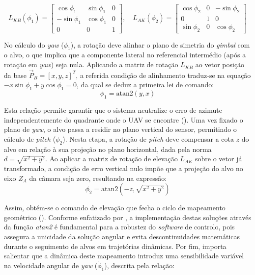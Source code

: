 \begin{equation}
    L_{KB}(\phi_1) = \begin{bmatrix} \cos\phi_1 & \sin\phi_1 & 0 \\ -\sin\phi_1 & \cos\phi_1 & 0 \\ 0 & 0 & 1 \end{bmatrix}, \quad 
    L_{AK}(\phi_2) = \begin{bmatrix} \cos\phi_2 & 0 & -\sin\phi_2 \\ 0 & 1 & 0 \\ \sin\phi_2 & 0 & \cos\phi_2 \end{bmatrix}
\end{equation}


No cálculo do \emph{yaw} ($\phi_1$), a rotação deve alinhar o plano de simetria do \emph{gimbal} com o alvo, o que implica que a componente lateral no referencial intermédio (após a rotação em \emph{yaw}) seja nula. Aplicando a matriz de rotação $L_{KB}$ ao vetor posição da base $\vec{P}_B = [x, y, z]^T$, a referida condição de alinhamento traduz-se na equação $-x\sin\phi_1 + y\cos\phi_1 = 0$, da qual se deduz a primeira lei de comando:
\begin{equation}\phi_{1} = \text{atan2}(y, x)\end{equation}

Esta relação permite garantir que o sistema neutralize o erro de azimute independentemente do quadrante onde o UAV se encontre (\cite{equations2001}). Uma vez fixado o plano de \emph{yaw}, o alvo passa a residir no plano vertical do sensor, permitindo o cálculo de \emph{pitch} ($\phi_2$). Nesta etapa, a rotação de \emph{pitch} deve compensar a cota $z$ do alvo em relação à sua projeção no plano horizontal, dada pela norma $d = \sqrt{x^2 + y^2}$. Ao aplicar a matriz de rotação de elevação $L_{AK}$ sobre o vetor já transformado, a condição de erro vertical nulo impõe que a projeção do alvo no eixo $Z_A$ da câmara seja zero, resultando na expressão:
\begin{equation}\phi_{2} = \text{atan2}(-z, \sqrt{x^2 + y^2})\end{equation}

Assim, obtém-se o comando de elevação que fecha o ciclo de mapeamento geométrico (\cite{equations2001}). Conforme enfatizado por \cite{bolton2018}, a implementação destas soluções através da função \emph{atan2} é fundamental para a robustez do \emph{software} de controlo, pois assegura a unicidade da solução angular e evita descontinuidades matemáticas durante o seguimento de alvos em trajetórias dinâmicas. Por fim, importa salientar que a dinâmica deste mapeamento introduz uma sensibilidade variável na velocidade angular de \emph{yaw} ($\dot{\phi}_1$), descrita pela relação:

